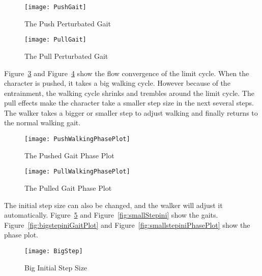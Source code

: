 \begin{figure}[!htbp]
  \begin{center}
      \texttt{[image: PushGait]}
    \caption{The Push Perturbated Gait}
    \label{fig:PushGait}
\end{center}
\end{figure}


\begin{figure}[!htbp]
  \begin{center}
      \texttt{[image: PullGait]}
    \caption{The Pull Perturbated Gait}
    \label{fig:PullGait}
\end{center}
\end{figure}

Figure~\ref{fig:PushGaitPlot} and Figure~\ref{fig:PullGaitPhasePlot} show the flow convergence of the limit cycle.
When the character is pushed, it takes a big walking cycle. 
However because of the entrainment, the walking cycle shrinks and trembles around the limit cycle. 
The pull effects make the character take a smaller step size in the next several steps.
The walker takes a bigger or smaller step to adjust walking and finally returns to the normal walking gait.


\begin{figure}[!htbp]
  \begin{center}
      \texttt{[image: PushWalkingPhasePlot]}
    \caption{The Pushed Gait Phase Plot}
    \label{fig:PushGaitPlot}
\end{center}
\end{figure}


\begin{figure}[!htbp]
  \begin{center}
      \texttt{[image: PullWalkingPhasePlot]}
    \caption{The Pulled Gait Phase Plot}
    \label{fig:PullGaitPhasePlot}
\end{center}
\end{figure}


The initial step size can also be changed, and the walker will adjust it automatically.
Figure~\ref{fig:bigStepIni} and Figure~\ref{fig:smallStepini} show the gaits.
Figure~\ref{fig:bigstepiniGaitPlot} and Figure~\ref{fig:smallstepiniPhasePlot} show the phase plot.

\begin{figure}[!htbp]
  \begin{center}
      \texttt{[image: BigStep]}
    \caption{Big Initial Step Size}
    \label{fig:bigStepIni}
\end{center}
\end{figure}


